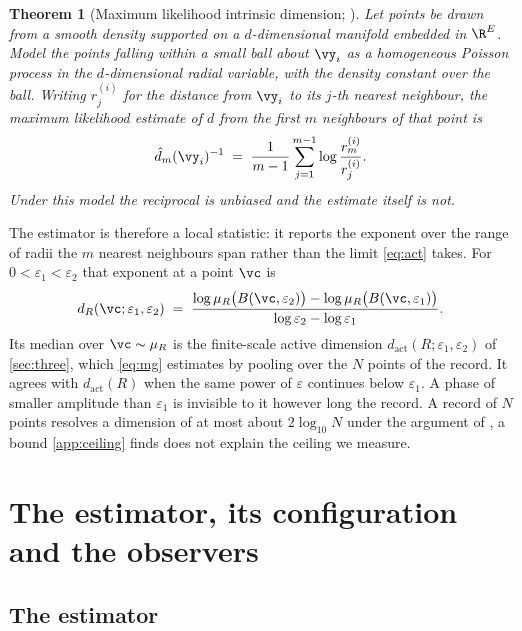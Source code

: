 \documentclass[twoside]{article}
\newtheorem{theorem}{Theorem}
\begin{document}
\begin{theorem}[Maximum likelihood intrinsic dimension;
\citealp{levina2004maximum, mackay2005comments}]\label{thm:lb}
Let points be drawn from a smooth density supported on a $d$-dimensional manifold embedded in
$\R^{E}$. Model the points falling within a small ball about $\vy_i$ as a homogeneous Poisson
process in the $d$-dimensional radial variable, with the density constant over the ball. Writing
$r^{(i)}_j$ for the distance from $\vy_i$ to its $j$-th nearest neighbour, the maximum likelihood
estimate of $d$ from the first $m$ neighbours of that point is
\begin{equation}\label{eq:lbpoint}
  \hat{d}_m(\vy_i)^{-1} \;=\; \frac{1}{m-1} \sum_{j=1}^{m-1} \log \frac{r^{(i)}_m}{r^{(i)}_j} .
\end{equation}
Under this model the reciprocal is unbiased and the estimate itself is not.
\end{theorem}

The estimator is therefore a local statistic: it reports the exponent over the range of radii the
$m$ nearest neighbours span rather than the limit \cref{eq:act} takes. For
$0 < \varepsilon_1 < \varepsilon_2$ that exponent at a point $\vc$ is
\begin{equation}\label{eq:finitescale}
  d_R(\vc; \varepsilon_1, \varepsilon_2) \;=\;
  \frac{\log \mu_R\bigl(B(\vc, \varepsilon_2)\bigr)
        - \log \mu_R\bigl(B(\vc, \varepsilon_1)\bigr)}
       {\log \varepsilon_2 - \log \varepsilon_1} .
\end{equation}
Its median over $\vc \sim \mu_R$ is the finite-scale active dimension
$d_{\mathrm{act}}(R; \varepsilon_1, \varepsilon_2)$ of \cref{sec:three}, which \cref{eq:mg}
estimates by pooling over the $N$ points of the record. It agrees with $d_{\mathrm{act}}(R)$ when
the same power of $\varepsilon$ continues below $\varepsilon_1$. A phase of smaller amplitude than
$\varepsilon_1$ is invisible to it however long the record. A record of $N$ points resolves a dimension of at most about
$2 \log_{10} N$ under the argument of \citet{eckmann1992fundamental}, a bound \cref{app:ceiling}
finds does not explain the ceiling we measure.

\section{The estimator, its configuration and the observers}\label{app:method}

\subsection{The estimator}\label{app:alg}
\end{document}
